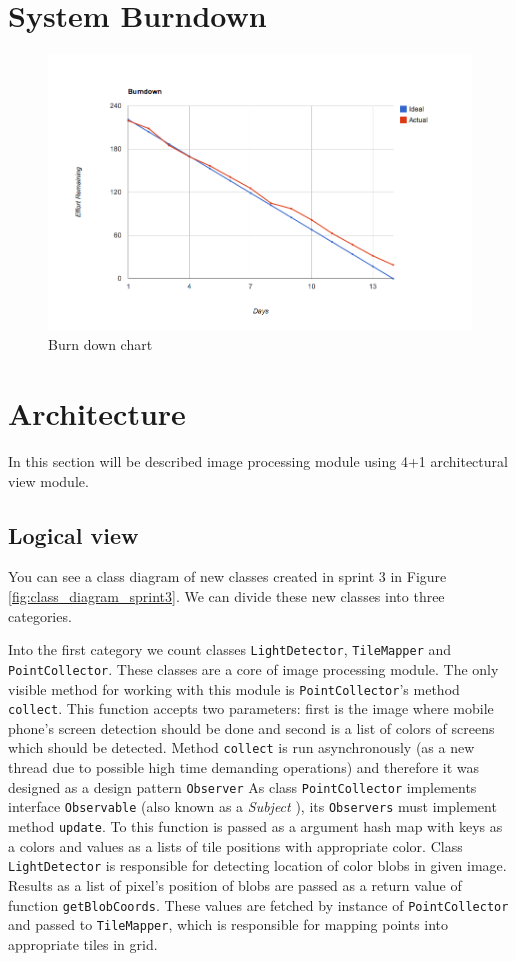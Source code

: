 \section{System Burndown}
\begin{figure}[H]
	\centering
		\includegraphics[width=18cm]{sprint3/BurndownSprint3.png}
	\caption{Burn down chart}
	\label{fig:Burn3 }
\end{figure}

\section{Architecture}
In this section will be described image processing module using 4+1 architectural view module.

\subsection{Logical view}
You can see a class diagram of new classes created in sprint 3 in Figure \ref{fig:class_diagram_sprint3}. We can divide these new classes into three categories. 

Into the first category we count classes \texttt{LightDetector}, \texttt{TileMapper} and \texttt{PointCollector}. 
These classes are a core of image processing module. 
The only visible method for working with this module is \texttt{PointCollector}'s method \texttt{collect}.
This function accepts two parameters: first is the image where mobile phone's screen detection should be done and second is a list of colors of screens which should be detected. 
Method \texttt{collect} is run asynchronously (as a new thread due to possible high time demanding operations) and therefore it was designed as a design pattern \texttt{Observer}
As class \texttt{PointCollector} implements interface \texttt{Observable} (also known as a \emph{Subject} \cite[p.~326]{Gamma:1995:DPE:186897}), its \texttt{Observers} must implement method \texttt{update}. 
To this function is passed as a argument hash map with keys as a colors and values as a lists of tile positions with appropriate color.
Class \texttt{LightDetector} is responsible for detecting location of color blobs in given image. 
Results as a list of pixel's position of blobs are passed as a return value of function \texttt{getBlobCoords}. 
These values are fetched by instance of \texttt{PointCollector} and passed to \texttt{TileMapper}, which is responsible for mapping points into appropriate tiles in grid.

